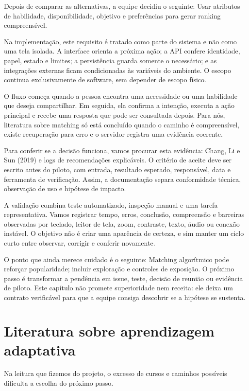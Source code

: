 \documentclass[12pt,oneside,a4paper,article]{abntex2}
\begin{document}
Depois de comparar as alternativas, a equipe decidiu o seguinte: Usar atributos de habilidade, disponibilidade, objetivo e preferências para gerar ranking compreensível.

Na implementação, este requisito é tratado como parte do sistema e não como uma tela isolada. A interface orienta a próxima ação; a API confere identidade, papel, estado e limites; a persistência guarda somente o necessário; e as integrações externas ficam condicionadas às variáveis do ambiente. O escopo continua exclusivamente de software, sem depender de escopo físico.

O fluxo começa quando a pessoa encontra uma necessidade ou uma habilidade que deseja compartilhar. Em seguida, ela confirma a intenção, executa a ação principal e recebe uma resposta que pode ser consultada depois. Para nós, literatura sobre matching só está concluído quando o caminho é compreensível, existe recuperação para erro e o servidor registra uma evidência coerente.

Para conferir se a decisão funciona, vamos procurar esta evidência: Chang, Li e Sun (2019) e logs de recomendações explicáveis. O critério de aceite deve ser escrito antes do piloto, com entrada, resultado esperado, responsável, data e ferramenta de verificação. Assim, a documentação separa conformidade técnica, observação de uso e hipótese de impacto.

A validação combina teste automatizado, inspeção manual e uma tarefa representativa. Vamos registrar tempo, erros, conclusão, compreensão e barreiras observadas por teclado, leitor de tela, zoom, contraste, texto, áudio ou conexão instável. O objetivo não é criar uma aparência de certeza, e sim manter um ciclo curto entre observar, corrigir e conferir novamente.

O ponto que ainda merece cuidado é o seguinte: Matching algorítmico pode reforçar popularidade; incluir exploração e controles de exposição. O próximo passo é transformar a pendência em issue, teste, decisão de reunião ou evidência de piloto. Este capítulo não promete superioridade nem receita: ele deixa um contrato verificável para que a equipe consiga descobrir se a hipótese se sustenta.

\section{Literatura sobre aprendizagem adaptativa}
Na leitura que fizemos do projeto, o excesso de cursos e caminhos possíveis dificulta a escolha do próximo passo.
\end{document}

